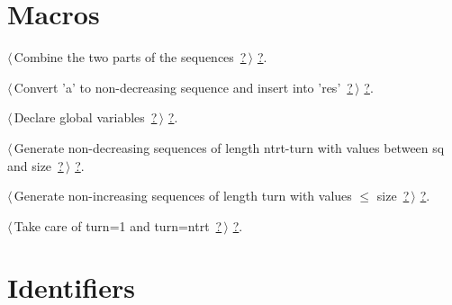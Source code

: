 \documentclass[reqno]{amsart}
\renewcommand{\NWlink}[2]{\hyperlink{#1}{#2}}
\begin{document}
\section{Macros}


{\small\begin{list}{}{\setlength{\itemsep}{-\parsep}\setlength{\itemindent}{-\leftmargin}}
\item $\langle\,$Combine the two parts of the sequences\nobreak\ {\footnotesize \NWlink{nuweb?}{?}}$\,\rangle$ {\footnotesize {\NWtxtRefIn} \NWlink{nuweb?}{?}.}
\item $\langle\,$Convert 'a' to non-decreasing sequence and insert into 'res'\nobreak\ {\footnotesize \NWlink{nuweb?}{?}}$\,\rangle$ {\footnotesize {\NWtxtRefIn} \NWlink{nuweb?}{?}.}
\item $\langle\,$Declare global variables\nobreak\ {\footnotesize \NWlink{nuweb?}{?}}$\,\rangle$ {\footnotesize {\NWtxtRefIn} \NWlink{nuweb?}{?}.}
\item $\langle\,$Generate non-decreasing sequences of length ntrt-turn with values between sq and size\nobreak\ {\footnotesize \NWlink{nuweb?}{?}}$\,\rangle$ {\footnotesize {\NWtxtRefIn} \NWlink{nuweb?}{?}.}
\item $\langle\,$Generate non-increasing sequences of length turn with values $\leq$ size\nobreak\ {\footnotesize \NWlink{nuweb?}{?}}$\,\rangle$ {\footnotesize {\NWtxtRefIn} \NWlink{nuweb?}{?}.}
\item $\langle\,$Take care of turn=1 and turn=ntrt\nobreak\ {\footnotesize \NWlink{nuweb?}{?}}$\,\rangle$ {\footnotesize {\NWtxtRefIn} \NWlink{nuweb?}{?}.}
\end{list}}

\section{Identifiers}
\end{document}
